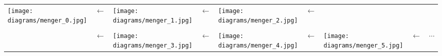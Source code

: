 \documentclass[pdftex, 10pt]{amsart}
\begin{document}
\newcommand{\w}{22mm}
\begin{longtable}{m{\w}m{2mm}m{\w}m{2mm}m{\w}m{2mm}m{\w}m{2mm}m{2cm}}
	\texttt{[image: diagrams/menger\_0.jpg]} &
	$\leftarrow$ &
	\texttt{[image: diagrams/menger\_1.jpg]} &
	$\leftarrow$ &
	\texttt{[image: diagrams/menger\_2.jpg]} &
	$\leftarrow$ &
    &
    &
    \\
	& & & & & & & &
    \\
    &
	$\leftarrow$ &
	\texttt{[image: diagrams/menger\_3.jpg]} &
	$\leftarrow$ &
	\texttt{[image: diagrams/menger\_4.jpg]} &
	$\leftarrow$ &
	\texttt{[image: diagrams/menger\_5.jpg]} &
	$\leftarrow$
	& $\cdots$
\end{longtable}
\end{document}
